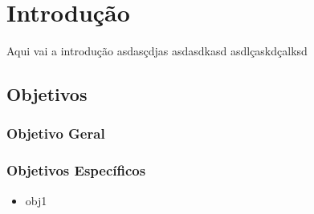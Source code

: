 
\chapter{Introdução}\label{intro}

Aqui vai a introdução
asdasçdjas
asdasdkasd
asdlçaskdçalksd


\section{Objetivos}
\subsection{Objetivo Geral }




\begin{comment}
Este é um comentário
\end{comment}

\subsection{Objetivos Específicos}
\begin{itemize}
\item obj1

\end{itemize}
